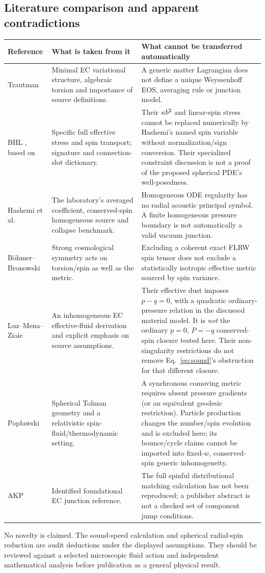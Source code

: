 \subsection{Literature comparison and apparent contradictions}
\begin{longtable}{p{}p{}p{}}
\toprule Reference & What is taken from it & What cannot be transferred automatically\\\midrule\endhead
Trautman \cite{Trautman} & Minimal EC variational structure, algebraic torsion and importance of source definitions. & A generic matter Lagrangian does not define a unique Weyssenhoff EOS, averaging rule or junction model.\\
BHL \cite{BHL}, based on \cite{OK} & Specific full effective stress and spin transport; signature and connection-slot dictionary. & Their $\kappa b^2$ and linear-spin stress cannot be replaced numerically by Hashemi's named spin variable without normalization/sign conversion. Their specialized constraint discussion is not a proof of the proposed spherical PDE's well-posedness.\\
Hashemi et al. \cite{Hashemi} & The laboratory's averaged coefficient, conserved-spin homogeneous source and collapse benchmark. & Homogeneous ODE regularity has no radial acoustic principal symbol. A finite homogeneous pressure boundary is not automatically a valid vacuum junction.\\
B\"ohmer--Bronowski \cite{BB} & Strong cosmological symmetry acts on torsion/spin as well as the metric. & Excluding a coherent exact FLRW spin tensor does not exclude a statistically isotropic effective metric sourced by spin variance.\\
Luz--Mena--Ziaie \cite{LMZ} & An inhomogeneous EC effective-fluid derivation and explicit emphasis on source assumptions. & Their effective dust imposes $p-q=0$, with a quadratic ordinary-pressure relation in the discussed material model. It is \emph{not} the ordinary $p=0$, $P=-q$ conserved-spin closure tested here. Their non-singularity restrictions do not remove Eq.~\eqref{eq:sound}'s obstruction for that different closure.\\
Pop\l awski \cite{Pop} & Spherical Tolman geometry and a relativistic spin-fluid/thermodynamic setting. & A synchronous comoving metric requires absent pressure gradients (or an equivalent geodesic restriction). Particle production changes the number/spin evolution and is excluded here; its bounce/cycle claims cannot be imported into fixed-$w$, conserved-spin generic inhomogeneity.\\
AKP \cite{AKP} & Identified foundational EC junction reference. & The full spinful distributional matching calculation has not been reproduced; a publisher abstract is not a checked set of component jump conditions.\\\bottomrule
\end{longtable}
No novelty is claimed. The sound-speed calculation and spherical radial-spin reduction are audit deductions under the displayed assumptions. They should be reviewed against a selected microscopic fluid action and independent mathematical analysis before publication as a general physical result.

